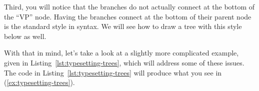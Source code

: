 Third, you will notice that the branches do not actually connect at the bottom of the ``VP'' node.
Having the branches connect at the bottom of their parent node is the standard style in syntax.
We will see how to draw a tree with this style below as well.

With that in mind, let's take a look at a slightly more complicated example, given in Listing~\ref{lst:typesetting-trees}, which will address some of these issues.
The code in Listing~\ref{lst:typesetting-trees} will produce what you see in (\ref{ex:typesetting-trees}).

\begin{exe}
    \label{ex:typesetting-trees}
\end{exe}

